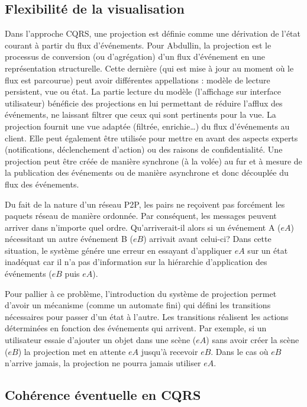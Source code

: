 \subsection{Flexibilité de la visualisation}
\label{sec:flexviz}
Dans l'approche \gls{CQRS}, une projection est définie comme une dérivation de 
l'état courant à 
partir du flux d'événements. Pour Abdullin, \og la projection est le processus de 
conversion (ou d'agrégation) d'un flux d'événement en une représentation 
structurelle. Cette dernière (qui est mise à jour au moment où le flux est 
parcourue) 
peut avoir différentes appellations : modèle de lecture persistent, vue ou 
état\fg{}\cite{Abdullin2011}.
La partie lecture du modèle (l'affichage sur interface utilisateur) bénéficie des 
projections en lui permettant de réduire l'afflux des événements, ne laissant filtrer 
que ceux qui sont pertinents pour la vue. La projection fournit une vue adaptée 
(filtrée, enrichie\ldots) du flux d'événements au client. Elle peut également être 
utilisée pour mettre en avant des aspects experts (notifications, déclenchement 
d'action) ou des raisons de confidentialité.
Une projection peut être créée de manière synchrone (à la volée) au fur et à 
mesure de la publication des événements ou de manière asynchrone et donc 
découplée du flux des événements. 


Du fait de la nature d'un réseau \gls{P2P}, les pairs ne reçoivent pas forcément les 
paquets réseau de manière ordonnée.
Par conséquent, les messages peuvent arriver dans n'importe quel ordre.
Qu'arriverait-il alors si un événement A ($eA$) nécessitant un autre événement B 
($eB$) arrivait avant celui-ci? Dans cette situation, le système génére une 
erreur en essayant d'appliquer $eA$ sur un état inadéquat car il n'a pas 
d'information sur la hiérarchie d'application des événements ($eB$ puis $eA$).

Pour pallier à ce problème, l'introduction du système de projection permet d'avoir 
un mécanisme (comme un automate fini) qui défini les transitions nécessaires 
pour 
passer d'un état à l'autre. Les transitions réalisent les actions déterminées en 
fonction des 
événements qui arrivent. Par exemple, si un utilisateur essaie d'ajouter un objet 
dans une 
scène  ($eA$) sans avoir créer la scène ($eB$) la projection met en attente $eA$ 
jusqu'à recevoir $eB$. Dans le cas où $eB$ n'arrive jamais, la projection ne pourra 
jamais utiliser $eA$.

\subsection{Cohérence éventuelle en CQRS}


